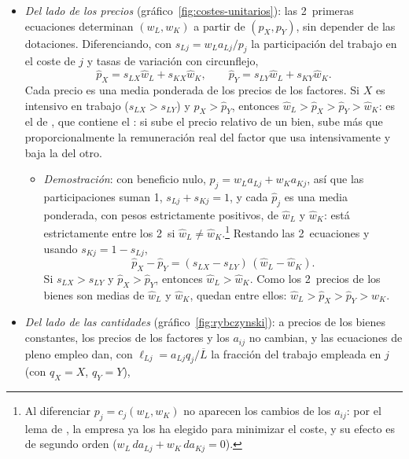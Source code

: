 \documentclass[11pt]{article}
\begin{document}
\begin{itemize}
\begin{equation}
  \end{equation}
\item \emph{Del lado de los precios} (gráfico~\ref{fig:costes-unitarios}): las 2~primeras ecuaciones determinan $(w_L,w_K)$ a partir de $(p_X,p_Y)$, sin depender de las dotaciones. Diferenciando, con $s_{Lj}=w_La_{Lj}/p_j$ la participación del trabajo en el coste de $j$ y tasas de variación con circunflejo,
  \begin{equation}
  \hat p_X=s_{LX}\hat w_L+s_{KX}\hat w_K,\qquad \hat p_Y=s_{LY}\hat w_L+s_{KY}\hat w_K .
  \end{equation}
  Cada precio es una media ponderada de los precios de los factores. Si $X$ es intensivo en trabajo ($s_{LX}>s_{LY}$) y $\hat p_X>\hat p_Y$, entonces $\hat w_L>\hat p_X>\hat p_Y>\hat w_K$: es el  de \textcite{Jones1965Structure}, que contiene el \nocite{StolperSamuelson1941Protection}: si sube el precio relativo de un bien, sube más que proporcionalmente la remuneración real del factor que usa intensivamente y baja la del otro.
  \begin{itemize}
  \item \emph{Demostración}: con beneficio nulo, $p_j=w_La_{Lj}+w_Ka_{Kj}$, así que las participaciones suman 1, $s_{Lj}+s_{Kj}=1$, y cada $\hat p_j$ es una media ponderada, con pesos estrictamente positivos, de $\hat w_L$ y $\hat w_K$: está estrictamente entre los 2~si $\hat w_L\neq\hat w_K$.\footnote{Al diferenciar $p_j=c_j(w_L,w_K)$ no aparecen los cambios de los $a_{ij}$: por el lema de , la empresa ya los ha elegido para minimizar el coste, y su efecto es de segundo orden ($w_L\,da_{Lj}+w_K\,da_{Kj}=0$).} Restando las 2~ecuaciones y usando $s_{Kj}=1-s_{Lj}$,
    \begin{equation*}
    \hat p_X-\hat p_Y=(s_{LX}-s_{LY})\,(\hat w_L-\hat w_K).
    \end{equation*}
    Si $s_{LX}>s_{LY}$ y $\hat p_X>\hat p_Y$, entonces $\hat w_L>\hat w_K$. Como los 2~precios de los bienes son medias de $\hat w_L$ y $\hat w_K$, quedan entre ellos: $\hat w_L>\hat p_X>\hat p_Y>\hat w_K$.\findemo
  \end{itemize}
\item \emph{Del lado de las cantidades} (gráfico~\ref{fig:rybczynski}): a precios de los bienes constantes, los precios de los factores y los $a_{ij}$ no cambian, y las ecuaciones de pleno empleo dan, con $\ell_{Lj}=a_{Lj}q_j/\overline{L}$ la fracción del trabajo empleada en $j$ (con $q_X=X$, $q_Y=Y$),

\end{itemize}
\end{document}
